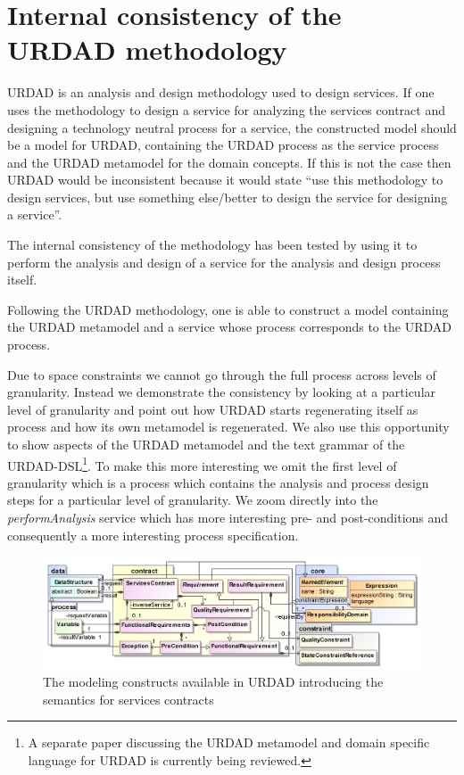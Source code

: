\section{Internal consistency of the URDAD methodology}
\label{sec:urdadConsistency}

URDAD is an analysis and design methodology used to design services. If one uses the methodology to design a service for analyzing the services contract and designing a technology neutral process for a service, the constructed model should be a model for URDAD, containing the URDAD process as the service process and the URDAD metamodel for the domain concepts. If this is not the case then URDAD would be inconsistent because it would state ``use this methodology to design services, but use something else/better to design the service for designing a service''. 

The internal consistency of the methodology has been tested by using it to perform the analysis and design of a service for the analysis and design process itself.

 Following the URDAD methodology, one is able to construct a model containing the URDAD metamodel and a service whose process corresponds to the URDAD process.

Due to space constraints we cannot go through the full process across levels of granularity. Instead we demonstrate the consistency by looking at a particular level of granularity and point out how URDAD starts regenerating itself as process and how its own metamodel is regenerated. We also use this opportunity to show aspects of the URDAD metamodel and the text grammar of the URDAD-DSL\footnote{A separate paper discussing the URDAD metamodel and domain specific language for URDAD is currently being reviewed.}. To make this more interesting we omit the first level of granularity which is a process which contains the analysis and process design steps for a particular level of granularity. We zoom directly into the \emph{performAnalysis} service which has more interesting pre- and post-conditions and consequently a more interesting process specification.

\begin{figure}[Htbp]
  \centering
  \includegraphics{contract}
  \caption{The modeling constructs available in URDAD introducing the semantics for services contracts}
  \label{fig:contractModule}
\end{figure}

